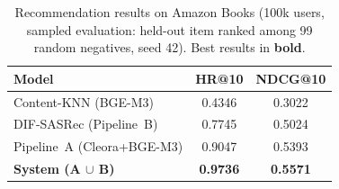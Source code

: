 \begin{table}[H]
\caption{Recommendation results on Amazon Books (100k users, sampled
         evaluation: held-out item ranked among 99 random negatives,
         seed 42).
         Best results in \textbf{bold}.}
\label{tab:main_results}
\centering
\begin{tabular}{lcc}
\toprule
\textbf{Model} & \textbf{HR@10} & \textbf{NDCG@10} \\
\midrule
Content-KNN (BGE-M3)            & 0.4346 & 0.3022 \\
DIF-SASRec (Pipeline~B)         & 0.7745 & 0.5024 \\
Pipeline~A (Cleora+BGE-M3)      & 0.9047 & 0.5393 \\
\midrule
\textbf{System (A $\cup$ B)}    & \textbf{0.9736} & \textbf{0.5571} \\
\bottomrule
\end{tabular}
\end{table}
